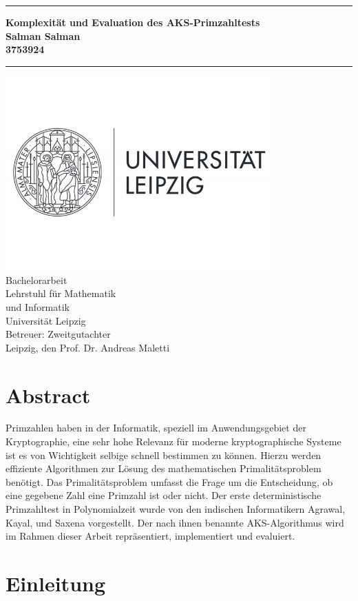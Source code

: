 \documentclass[12pt,oneside]{article}
\theoremstyle{remark}
\theoremstyle{definition}
\newcommand{\JMUTitle}[9]{

  \thispagestyle{empty}
  \vspace*{\stretch{1}}
  {\parindent0cm
  \rule{\linewidth}{.7ex}}
  \begin{flushright}
    \vspace*{\stretch{1}}
    \sffamily\bfseries\Huge
    #1\\
    \vspace*{\stretch{1}}
    \sffamily\bfseries\large
    #2\\
    \vspace*{\stretch{1}}
    \sffamily\bfseries\small
    #3
  \end{flushright}
  \rule{\linewidth}{.7ex}

  \vspace*{\stretch{1}}
  \begin{center}
    \includegraphics[width=4in]{logo} \\
    \vspace*{\stretch{1}}
    \Large  Bachelorarbeit   \\

    \vspace*{\stretch{2}}
   \large Lehrstuhl für Mathematik \\
    \large und Informatik \\
    \large Universität Leipzig\\
    \vspace*{\stretch{1}}
    \large Betreuer:  #8 \\[1mm]
    
    \vspace*{\stretch{1}}
    \large Leipzig, den #7
  \end{center}
}
\begin{document}
  \JMUTitle
      {Komplexität und Evaluation des AKS-Primzahltests  }  
      {Salman Salman}                        
      {3753924}
      
      {Fakultät für Informatik und Mathematik}  %
      {Leipzig 2020}                          %
      {\today}                              %
      {Prof. Dr. Andreas Maletti}               %
      {Zweitgutachter}                          %
      
  \clearpage

\lhead{}
    \setcounter{page}{1}

\tableofcontents
\clearpage

\listoffigures

\listoftables
\clearpage

\setlength{\parskip}{0.5em} 


\section*{Abstract}
Primzahlen haben in der Informatik, speziell im Anwendungsgebiet der Kryptographie, eine sehr hohe Relevanz für moderne kryptographische Systeme ist es von Wichtigkeit selbige schnell bestimmen zu können. Hierzu werden effiziente Algorithmen zur Lösung des mathematischen Primalitätsproblem benötigt. Das Primalitätsproblem umfasst die Frage um die Entscheidung, ob eine gegebene Zahl eine Primzahl ist oder nicht. Der erste deterministische Primzahltest in Polynomialzeit wurde von den indischen Informatikern Agrawal, Kayal, und Saxena vorgestellt. Der nach ihnen benannte AKS-Algorithmus wird im Rahmen dieser Arbeit repräsentiert, implementiert und evaluiert.  


\clearpage
{}  
    \setcounter{page}{1}
\lhead{\nouppercase{\leftmark}}


 

\section{Einleitung} \label{einleitung}
\end{document}
